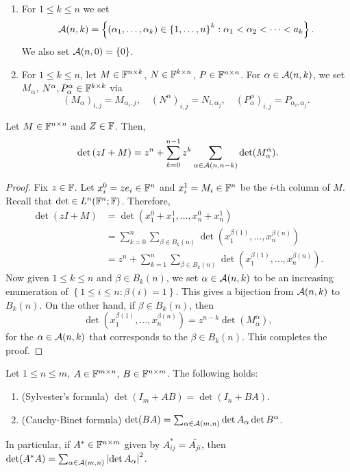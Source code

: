 \documentclass[a4paper]{article}
\renewcommand{\sumk}{\sum_{k=0}}
\begin{document}
\begin{defi}
\begin{enumerate}
\item For $1 \leq k \leq n$ we set
\[
\mathcal{A}(n, k) = \left\{ (\alpha_1, \dots, \alpha_k)
\in \left\{ 1, \dots, n \right\}^k :
\alpha_1 < \alpha_2 < \dots < a_k \right\}.
\]
We also set $\mathcal{A}(n, 0) = \left\{ 0 \right\}$.

\item For $1 \leq k \leq n$, let $M \in \mathbb{F}^{n \times k}$,
$N \in \mathbb{F}^{k \times n}$, $P \in \mathbb{F}^{n \times n}$. For
$\alpha \in \mathcal{A}(n, k)$, we set
$M_\alpha$, $N^\alpha, P_\alpha^\alpha \in \mathbb{F}^{k \times k}$
via
\[
(M_\alpha)_{i, j} = M_{\alpha_i, j}, \quad
(N^\alpha)_{i, j} = N_{i, \alpha_j}, \quad
(P_\alpha^\alpha)_{i, j} = P_{\alpha_i, \alpha_j}.
\]
\end{enumerate}
\end{defi}

\begin{thm}
Let $M \in \mathbb{F}^{n \times n}$ and $Z \in \mathbb{F}$. Then,
\[
\det \left( zI + M \right) = z^n + \sumk^{n-1}
z^k \sum_{\alpha \in \acal(n, n - k)} \det(M_\alpha^\alpha).
\]
\end{thm}

\begin{proof}
Fix $z \in \mathbb{F}$. Let $x_i^0 = z e_i \in \mathbb{F}^n$ and
$x_i^1 = M_i \in \mathbb{F}^n$ be the $i$-th column of $M$.
Recall that $\det \in L^n (\mathbb{F}^n ; \mathbb{F})$. Therefore,
\[
\begin{aligned}
\det (z I + M)
&= \det (x_1^0 + x_1^1, \dots, x_n^0 + x_n^1) \\
&= \sum_{k=0}^n \sum_{\beta \in B_k(n)}
\det (x_1^{\beta(1)}, \dots, x_n^{\beta(n)}) \\
&= z^n + \sum_{k=1}^n \sum_{\beta \in B_k(n)}
\det (x_1^{\beta(1)}, \dots, x_n^{\beta(n)}).
\end{aligned}
\]
Now given $1 \leq k \leq n$ and $\beta \in B_k(n)$,
we set $\alpha \in \mathcal{A}(n, k)$ to be an increasing
enumeration of $\left\{ 1 \leq i \leq n : \beta(i) = 1
\right\}$. This gives a bijection from $\mathcal{A}(n, k)$
to $B_k(n)$. On the other hand, if $\beta \in B_k(n)$,
then
\[
\det (x_1^{\beta(1)}, \dots, x_n^{\beta(n)})
= z^{n - k} \det(M_\alpha^\alpha),
\]
for the $\alpha \in \mathcal{A}(n, k)$ that corresponds to
the $\beta \in B_k(n)$. This completes the proof.
\end{proof}

\begin{thm}
Let $1 \leq n \leq m$, $A \in \mathbb{F}^{m \times n}$,
$B \in \mathbb{F}^{n \times m}$. The following holds:
\begin{enumerate}
\item (Sylvester's formula) $\det(I_m + A B)
= \det(I_n + BA)$.

\item (Cauchy-Binet formula) $\det(BA) = \sum_{\alpha
\in \mathcal{A}(m, n)} \det A_\alpha \det B^\alpha$.
\end{enumerate}
In particular, if $A^* \in \mathbb{F}^{n \times m}$ given
by $A^*_{ij} = \bar{A_{ji}}$, then
$\det(A^* A) = \sum_{\alpha \in \mathcal{A}(m, n)}
\left\lvert \det A_\alpha\right\rvert^2$.
\end{thm}
\end{document}
